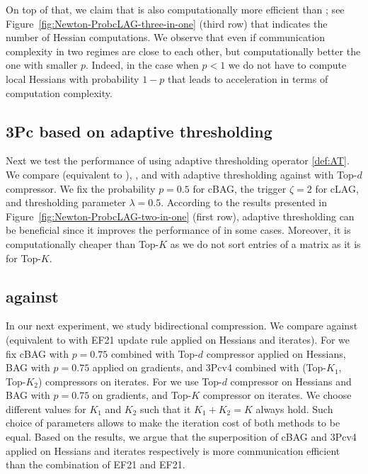 \documentclass[11pt]{article}
\begin{document}
	On top of that, we claim that  is also computationally more efficient than ; see Figure~\ref{fig:Newton-ProbcLAG-three-in-one} (third row) that indicates the number of Hessian computations. We observe that even if communication complexity in two regimes are close to each other, but computationally better the one with smaller $p$. Indeed, in the case when $p < 1$ we do not have to compute local Hessians with probability $1-p$ that leads to acceleration in terms of computation complexity.
	
	
	
	
	\subsection{ 3Pc based on adaptive thresholding}
	Next we test the performance of  using adaptive thresholding operator \eqref{def:AT}. We compare  (equivalent to ), , and  with adaptive thresholding against  with Top-$d$ compressor. We fix the probability $p=0.5$ for cBAG, the trigger $\zeta=2$ for cLAG, and thresholding parameter $\lambda=0.5$. According to the results presented in Figure~\ref{fig:Newton-ProbcLAG-two-in-one} (first row), adaptive thresholding can be beneficial since it improves the performance of  in some cases. Moreover, it is computationally cheaper than Top-$K$ as we do not sort entries of a matrix as it is for Top-$K$.	
	
	\subsection{ against }
	In our next experiment, we study bidirectional compression. We compare  against  (equivalent to  with EF21 update rule applied on Hessians and iterates). For  we fix cBAG with $p=0.75$ combined with Top-$d$ compressor applied on Hessians, BAG with $p=0.75$ applied on gradients, and 3Pcv4 \citep{richtarik3Pc} combined with (Top-$K_1$, Top-$K_2$) compressors on iterates. For  we use Top-$d$ compressor on Hessians and BAG with $p=0.75$ on gradients, and Top-$K$ compressor on iterates. We choose different values for $K_1$ and $K_2$ such that it $K_1+K_2=K$ always hold. Such choice of parameters allows to make the iteration cost of both methods to be equal. Based on the results, we argue that the superposition of cBAG and 3Pcv4 applied on Hessians and iterates respectively is more communication efficient than the combination of EF21 and EF21.
	
\end{document}
